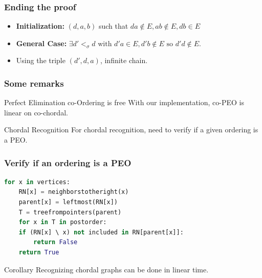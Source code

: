 \documentclass{beamer}
\begin{document}
\begin{frame}\frametitle{Ending the proof}

    \begin{center}
    \end{center}

    \begin{itemize}
	\item \textbf{Initialization:} $(d, a, b)$ such that $da \notin E, ab \notin E, db \in E$
	\item \textbf{General Case:} $\exists d' <_{\sigma} d\text{ with }d'a \in E, d'b \notin E\text{ so }d'd \notin E$.
	\item Using the triple $(d', d, a)$, infinite chain.
    \end{itemize}

\end{frame}


\begin{frame}\frametitle{Some remarks}
     \begin{block}{Perfect Elimination co-Ordering is free}
	  With our implementation, co-PEO is linear on co-chordal.
     \end{block}


     \begin{alertblock}{Chordal Recognition}
	  For chordal recognition, need to verify if a given ordering is a PEO.
     \end{alertblock}
\end{frame}


\begin{frame}[fragile]\frametitle{Verify if an ordering is a PEO}
    \begin{lstlisting}[language = Python]
    for x in vertices:
	RN[x] = neighborstotheright(x)
	parent[x] = leftmost(RN[x])
    T = treefrompointers(parent)
    for x in T in postorder:
	if (RN[x] \ x) not included in RN[parent[x]]:
	    return False
    return True
    \end{lstlisting}
    
    \begin{block}{Corollary}
	Recognizing chordal graphs can be done in linear time.
    \end{block}
\end{frame}
\end{document}
